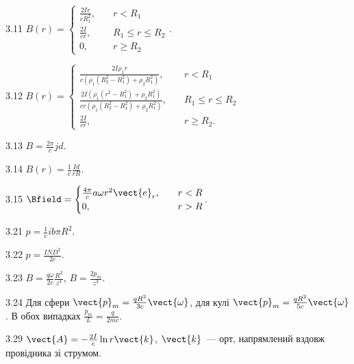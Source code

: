 \begin{Solution}{3.{11}}
	$B(r) = %
		\begin{cases}
			\frac{2Ir}{cR_1^2}, & \quad r < R_1           \\
			\frac{2I}{cr},      & \quad R_1 \le r \le R_2 \\
			0,                  & \quad r \ge R_2
		\end{cases}
	$.
\end{Solution}
\begin{Solution}{3.{12}}
	$B(r) = %
		\begin{cases}
			\frac{2I\rho_1r}{c(\rho_1(R_2^2 - R_1^2) + \rho_2R_1^2)}, & \quad r < R_1           \\
			\frac{2I(\rho_1(r^2 - R_1^2) + \rho_2R_1^2)}{cr(\rho_1(R_2^2 - R_1^2) + \rho_2R_1^2)},      & \quad R_1 \le r \le R_2 \\
			\frac{2I}{cr},                  & \quad r \ge R_2.
		\end{cases}
	$
\end{Solution}
\begin{Solution}{3.{13}}
	$B = \frac{2\pi}{c} jd$.
\end{Solution}
\begin{Solution}{3.{14}}
	$B(r) = \frac{1}{c}\frac{Id}{rR}$.
\end{Solution}
\begin{Solution}{3.{15}}
	$\Bfield = %
		\begin{cases}
			\frac{4\pi}{c} a \omega r^2 \vect{e}_r, & \quad r < R \\
			0,                                      & \quad r > R
		\end{cases}
	$.
\end{Solution}
\begin{Solution}{3.{21}}
		$p = \frac1c ib \pi R^2$.	
	
\end{Solution}
\begin{Solution}{3.{22}}
	$p = \frac{IND^2}{2c}$.
\end{Solution}
\begin{Solution}{3.{23}}
	$B = \frac{q\omega}{2c}\frac{R^2}{z^3}$, $B = \frac{2p_m}{z^3}$.
\end{Solution}
\begin{Solution}{3.{24}}
	Для сфери $\vect{p}_m = \frac{qR^2}{3c}\vect{\omega}$,
	для кулі $\vect{p}_m = \frac{qR^2}{5c}\vect{\omega}$.
	В обох випадках $\frac{p_m}{L} = \frac{q}{2mc}$.
\end{Solution}
\begin{Solution}{3.{29}}
	$\vect{A} =-  \frac{2I}{c}\ln r \vect{k}$, $\vect{k}$~--- орт, напрямлений вздовж провідника зі струмом.
\end{Solution}
